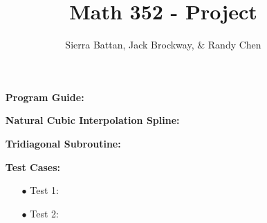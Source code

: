 \documentclass{amsart}
\begin{document}
\title{Math 352 - Project} %
\author{Sierra Battan, Jack Brockway, \(\&\) Randy Chen}
\maketitle

\begin{enumerate}

	\item[] \textbf{Program Guide:}
	\begin{enumerate}
		\item[] 
	\end{enumerate}
	
	\smallskip
	\item[] \textbf{Natural Cubic Interpolation Spline:}
	\begin{enumerate} 
		\item[] 
	\end{enumerate}
	
	\smallskip
	\item[] \textbf{Tridiagonal Subroutine:} 
	\begin{enumerate}
		\item[] 
	\end{enumerate}
		
	\item[] \textbf{Test Cases:}
	\begin{enumerate}
		\item[\(\bullet\)] Test 1:
		\begin{enumerate}
			\item[]
		\end{enumerate}
			
		\item[\(\bullet\)] Test 2:
		\begin{enumerate}
			\item[] 
		\end{enumerate}
	\end{enumerate}		
		
\end{enumerate}		
\end{document}
